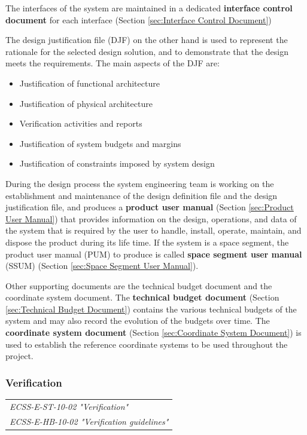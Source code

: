The interfaces of the system are maintained in a dedicated \textbf{interface control document} for each interface (Section \ref{sec:Interface Control Document}) 

The design justification file (DJF) on the other hand is used to represent the rationale for the selected design solution, and to demonstrate that the design meets the requirements. The main aspects of the DJF are:

\begin{itemize}
\item Justification of functional architecture
\item Justification of physical architecture
\item Verification activities and reports
\item Justification of system budgets and margins
\item Justification of constraints imposed by system design
\end{itemize}

During the design process the system engineering team is working on the establishment and maintenance of the design definition file and the design justification file, and produces a \textbf{product user manual} (Section \ref{sec:Product User Manual}) that provides information on the design, operations, and data of the system that is required by the user to handle, install, operate, maintain, and dispose the product during its life time. If the system is a space segment, the product user manual (PUM) to produce is called \textbf{space segment user manual} (SSUM) (Section \ref{sec:Space Segment User Manual}).

Other supporting documents are the technical budget document and the coordinate system document. The \textbf{technical budget document} (Section \ref{sec:Technical Budget Document}) contains the various technical budgets of the system and may also record the evolution of the budgets over time. The \textbf{coordinate system document} (Section \ref{sec:Coordinate System Document}) is used to establish the reference coordinate systems to be used throughout the project.

\subsubsection{Verification}
\label{sec:Verification}

\begin{tabular}{l}
\textit{ECSS-E-ST-10-02 "Verification" \cite{ECSS-E-ST-10-02}} \\
\textit{ECSS-E-HB-10-02 "Verification guidelines" \cite{ECSS-E-HB-10-02}}
\end{tabular}

